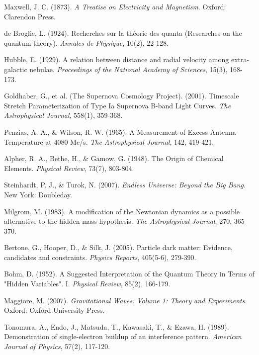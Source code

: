 \documentclass[pdflatex,sn-mathphys-num]{sn-jnl}
\begin{document}
\begin{thebibliography}{99}
Maxwell, J. C. (1873). \textit{A Treatise on Electricity and Magnetism}. Oxford: Clarendon Press.

de Broglie, L. (1924). Recherches sur la théorie des quanta (Researches on the quantum theory). \textit{Annales de Physique}, 10(2), 22-128.

Hubble, E. (1929). A relation between distance and radial velocity among extra-galactic nebulae. \textit{Proceedings of the National Academy of Sciences}, 15(3), 168-173.

Goldhaber, G., et al. (The Supernova Cosmology Project). (2001). Timescale Stretch Parameterization of Type Ia Supernova B-band Light Curves. \textit{The Astrophysical Journal}, 558(1), 359-368.

Penzias, A. A., \& Wilson, R. W. (1965). A Measurement of Excess Antenna Temperature at 4080 Mc/s. \textit{The Astrophysical Journal}, 142, 419-421.

Alpher, R. A., Bethe, H., \& Gamow, G. (1948). The Origin of Chemical Elements. \textit{Physical Review}, 73(7), 803-804.

Steinhardt, P. J., \& Turok, N. (2007). \textit{Endless Universe: Beyond the Big Bang}. New York: Doubleday.

Milgrom, M. (1983). A modification of the Newtonian dynamics as a possible alternative to the hidden mass hypothesis. \textit{The Astrophysical Journal}, 270, 365-370.

Bertone, G., Hooper, D., \& Silk, J. (2005). Particle dark matter: Evidence, candidates and constraints. \textit{Physics Reports}, 405(5-6), 279-390.

Bohm, D. (1952). A Suggested Interpretation of the Quantum Theory in Terms of "Hidden Variables". I. \textit{Physical Review}, 85(2), 166-179.

Maggiore, M. (2007). \textit{Gravitational Waves: Volume 1: Theory and Experiments}. Oxford: Oxford University Press.

Tonomura, A., Endo, J., Matsuda, T., Kawasaki, T., \& Ezawa, H. (1989). Demonstration of single-electron buildup of an interference pattern. \textit{American Journal of Physics}, 57(2), 117-120.


\end{thebibliography}
\end{document}
